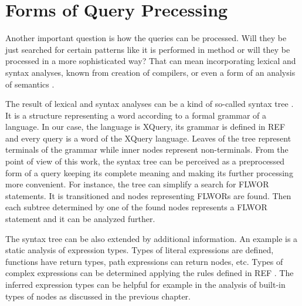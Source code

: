 
\section{Forms of Query Precessing}
Another important question is how the queries can be processed. Will they be just searched for certain patterns like it is performed in method \cite{Necasky:2009:DXK:1529282.1529414} or will they be processed in a more sophisticated way? That can mean incorporating lexical and syntax analyses, known from creation of compilers, or even a form of an analysis of semantics \cite{compilers}.

The result of lexical and syntax analyses can be a kind of so-called syntax tree \cite{compilers}. It is a structure representing a word according to a formal grammar of a language. In our case, the language is XQuery, its grammar is defined in REF  and every query is a word of the XQuery language. Leaves of the tree represent terminals of the grammar while inner nodes represent non-terminals.  From the point of view of this work, the syntax tree can be perceived as a preprocessed form of a query keeping its complete meaning and making its further processing more convenient. For instance, the tree can simplify a search for FLWOR statements. It is transitioned and nodes representing FLWORs are found. Then each subtree determined by one of the found nodes represents a FLWOR statement and it can be analyzed further.


The syntax tree can be also extended by additional information. An example is a static analysis of expression types. Types of literal expressions are defined, functions have return types, path expressions can return nodes, etc. Types of complex expressions can be determined applying the rules defined in REF . The inferred expression types can be helpful for example in the analysis of built-in types of nodes as discussed in the previous chapter. 

